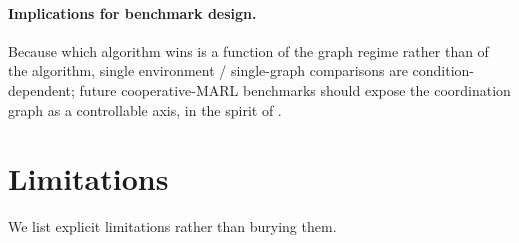 \paragraph{Implications for benchmark design.} Because which algorithm wins
is a function of the graph regime rather than of the algorithm, single
environment / single-graph comparisons are condition-dependent; future
cooperative-MARL benchmarks should expose the coordination graph as a
controllable axis, in the spirit of \coordgrid.

\section{Limitations}
\label{sec:limitations}

We list explicit limitations rather than burying them.
